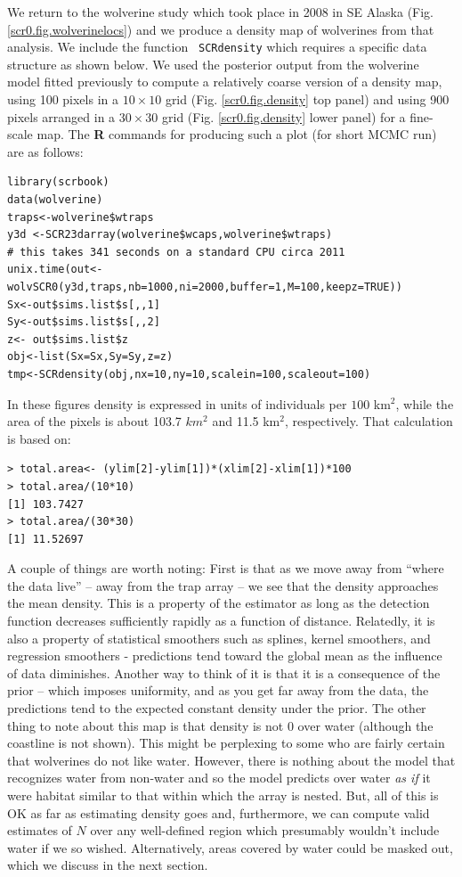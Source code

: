 We return to the wolverine study which took place in 2008 in SE Alaska
(Fig. \ref{scr0.fig.wolverinelocs}) and we produce a density map of
wolverines from that analysis. We include the function \mbox{\tt
  SCRdensity} which requires a specific data structure as shown below.
We used the posterior output from the wolverine model fitted
previously to compute a relatively coarse version of a density map,
using 100 pixels in a $10 \times 10$ grid (Fig. \ref{scr0.fig.density}
top panel) and using 900 pixels arranged in a $30 \times 30$ grid
(Fig. \ref{scr0.fig.density} lower panel) for a fine-scale map. The
{\bf R} commands for producing such a plot (for short MCMC run) are as
follows: 
{\small
\begin{verbatim}
library(scrbook)
data(wolverine)
traps<-wolverine$wtraps
y3d <-SCR23darray(wolverine$wcaps,wolverine$wtraps)
# this takes 341 seconds on a standard CPU circa 2011
unix.time(out<-wolvSCR0(y3d,traps,nb=1000,ni=2000,buffer=1,M=100,keepz=TRUE))
Sx<-out$sims.list$s[,,1]
Sy<-out$sims.list$s[,,2]
z<- out$sims.list$z
obj<-list(Sx=Sx,Sy=Sy,z=z)
tmp<-SCRdensity(obj,nx=10,ny=10,scalein=100,scaleout=100)
\end{verbatim}
In these figures density is
expressed in units of individuals per $100$ km$^2$, while the area of
the pixels is about 103.7 $km^2$ and 11.5 km$^2$, respectively. That
calculation is based on:
\begin{verbatim}
> total.area<- (ylim[2]-ylim[1])*(xlim[2]-xlim[1])*100
> total.area/(10*10)
[1] 103.7427
> total.area/(30*30)
[1] 11.52697
\end{verbatim}

A couple of things are worth noting: First is that as we move away
from ``where the data live'' -- away from the trap array -- we see that
the density approaches the mean density. This is a property of the
estimator as long as the detection function decreases sufficiently
rapidly as a function of distance.  Relatedly, it is also a property
of statistical smoothers such as splines, kernel smoothers, and
regression smoothers - predictions tend toward the global mean as the
influence of data diminishes.
 Another way to think of it is that it is
a consequence of the prior -- which imposes uniformity, and as you get
far away from the data, the predictions tend to the expected constant
density under the prior.  The other thing to note about this map is
that density is not $0$ over water (although the coastline is not
shown). This might be perplexing to some who are fairly certain that
wolverines do not like water. However, there is nothing about the
model that recognizes water from non-water and so the model predicts
over water {\it as if} it were habitat similar to that within which
the array is nested. But, all of this is OK as far as estimating
density goes and, furthermore, we can compute valid estimates of $N$
over any well-defined region which presumably wouldn't include water
if we so wished. Alternatively, areas covered by water could be masked
out, which we discuss in the next section.

}
